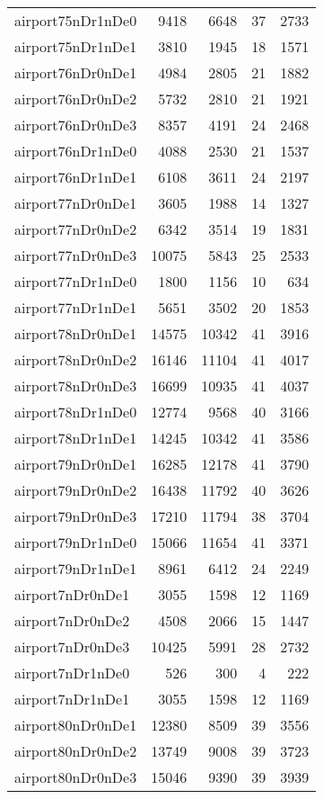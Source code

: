 \begin{tabular}{lrrrr}
airport75nDr1nDe0 & 9418 & 6648 & 37 & 2733 \\
airport75nDr1nDe1 & 3810 & 1945 & 18 & 1571 \\
airport76nDr0nDe1 & 4984 & 2805 & 21 & 1882 \\
airport76nDr0nDe2 & 5732 & 2810 & 21 & 1921 \\
airport76nDr0nDe3 & 8357 & 4191 & 24 & 2468 \\
airport76nDr1nDe0 & 4088 & 2530 & 21 & 1537 \\
airport76nDr1nDe1 & 6108 & 3611 & 24 & 2197 \\
airport77nDr0nDe1 & 3605 & 1988 & 14 & 1327 \\
airport77nDr0nDe2 & 6342 & 3514 & 19 & 1831 \\
airport77nDr0nDe3 & 10075 & 5843 & 25 & 2533 \\
airport77nDr1nDe0 & 1800 & 1156 & 10 & 634 \\
airport77nDr1nDe1 & 5651 & 3502 & 20 & 1853 \\
airport78nDr0nDe1 & 14575 & 10342 & 41 & 3916 \\
airport78nDr0nDe2 & 16146 & 11104 & 41 & 4017 \\
airport78nDr0nDe3 & 16699 & 10935 & 41 & 4037 \\
airport78nDr1nDe0 & 12774 & 9568 & 40 & 3166 \\
airport78nDr1nDe1 & 14245 & 10342 & 41 & 3586 \\
airport79nDr0nDe1 & 16285 & 12178 & 41 & 3790 \\
airport79nDr0nDe2 & 16438 & 11792 & 40 & 3626 \\
airport79nDr0nDe3 & 17210 & 11794 & 38 & 3704 \\
airport79nDr1nDe0 & 15066 & 11654 & 41 & 3371 \\
airport79nDr1nDe1 & 8961 & 6412 & 24 & 2249 \\
airport7nDr0nDe1 & 3055 & 1598 & 12 & 1169 \\
airport7nDr0nDe2 & 4508 & 2066 & 15 & 1447 \\
airport7nDr0nDe3 & 10425 & 5991 & 28 & 2732 \\
airport7nDr1nDe0 & 526 & 300 & 4 & 222 \\
airport7nDr1nDe1 & 3055 & 1598 & 12 & 1169 \\
airport80nDr0nDe1 & 12380 & 8509 & 39 & 3556 \\
airport80nDr0nDe2 & 13749 & 9008 & 39 & 3723 \\
airport80nDr0nDe3 & 15046 & 9390 & 39 & 3939 \\

\end{tabular}
